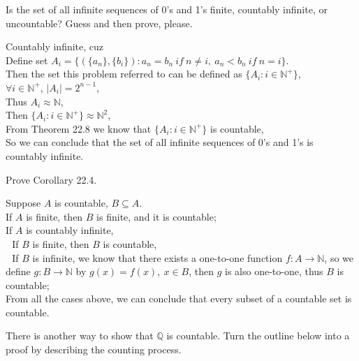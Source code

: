 \documentclass[11pt, a4paper, UTF8]{ctexart}
\begin{document}
\begin{problem}[UD: 22.3]
  Is the set of all infinite sequences of 0's and 1's finite, countably 
  infinite, or uncountable? Guess and then prove, please.
\end{problem}

\begin{solution}
  Countably infinite, cuz\\
  Define set $A_{i} = \{ (\{ a_{n} \}, \{ b_{i} \}): a_{n} = b_{n}~
  if~n \neq i,~a_{n} < b_{n}~if~n = i \}$.\\
  Then the set this problem referred to can be defined as $\{ A_{i}: i \in \mathbb{N}^{+} \}$,\\
  $\forall i \in \mathbb{N}^{+}$, $|A_{i}| = 2^{n - 1}$,\\
  Thus $A_{i} \approx \mathbb{N}$,\\
  Then $\{ A_{i}: i \in \mathbb{N}^{+} \} \approx \mathbb{N}^{2}$,\\
  From Theorem 22.8 we know that $\{ A_{i}: i \in \mathbb{N}^{+} \}$ 
  is countable,\\
  So we can conclude that the set of all infinite sequences of 0's 
  and 1's is countably infinite.
\end{solution}

\begin{problem}[UD: 22.6]
  Prove Corollary 22.4.
\end{problem}

\begin{solution}
  Suppose $A$ is countable, $B \subseteq A$.\\
  If $A$ is finite, then $B$ is finite, and it is countable;\\
  If $A$ is countably infinite,\\
  $~~~$If $B$ is finite, then $B$ is countable,\\
  $~~~$If $B$ is infinite, we know that there exists a one-to-one 
  function $f: A \rightarrow \mathbb{N}$, so we define $g: B \rightarrow \mathbb{N}$ 
  by $g(x) = f(x),~x \in B$, then $g$ is also one-to-one, thus $B$ is 
  countable;\\
  From all the cases above, we can conclude that every subset of a 
  countable set is countable.
\end{solution}

\begin{problem}[UD: 22.9]
  There is another way to show that $\mathbb{Q}$ is countable. Turn 
  the outline below into a proof by describing the counting process.
\end{problem}
\end{document}

